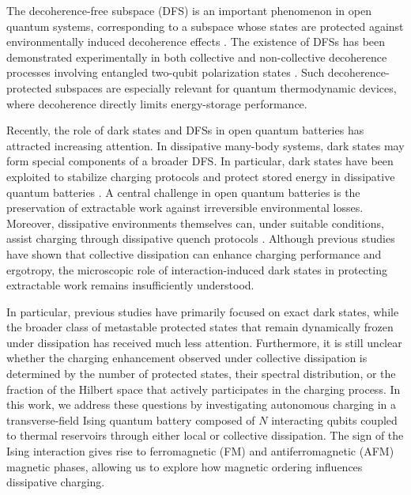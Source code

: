 \documentclass[aps,superscriptaddress,twocolumn,pre,longbibliography,floatfix]{revtex4-1}
\begin{document}
	The decoherence-free subspace (DFS) is an important phenomenon in open quantum systems, corresponding to a subspace whose states are protected against environmentally induced decoherence effects \cite{PhysRevLett.81.2594,lidar2003decoherence}. The existence of DFSs has been demonstrated experimentally in both collective and non-collective decoherence processes involving entangled two-qubit polarization states \cite{wu2002creating,kwiat2000experimental}. Such decoherence-protected subspaces are especially relevant for quantum thermodynamic devices, where decoherence directly limits energy-storage performance.
	
	Recently, the role of dark states and DFSs in open quantum batteries has attracted increasing attention. In dissipative many-body systems, dark states may form special components of a broader DFS. In particular, dark states have been exploited to stabilize charging protocols and protect stored energy in dissipative quantum batteries \cite{PhysRevApplied.14.024092}. A central challenge in open quantum batteries is the preservation of extractable work against irreversible environmental losses. Moreover, dissipative environments themselves can,  under suitable conditions, assist charging through dissipative quench protocols \cite{grazi2026charging}. Although previous studies have shown that collective dissipation can enhance charging performance and ergotropy, the microscopic role of interaction-induced dark states in protecting extractable work remains insufficiently understood.
	
	In particular, previous studies have primarily focused on exact dark states, while the broader class of metastable protected states that remain dynamically frozen under dissipation has received much less attention. Furthermore, it is still unclear whether the charging enhancement observed under collective dissipation is determined by the number of protected states, their spectral distribution, or the fraction of the Hilbert space that actively participates in the charging process. In this work, we address these questions by investigating autonomous charging in a transverse-field Ising quantum battery composed of $N$ interacting qubits coupled to thermal reservoirs through either local or collective dissipation. The sign of the Ising interaction gives rise to ferromagnetic (FM) and antiferromagnetic (AFM) magnetic phases, allowing us to explore how magnetic ordering influences dissipative charging.
	
\end{document}
